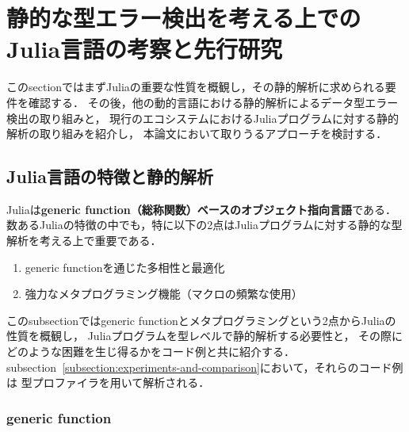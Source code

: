 
\section{静的な型エラー検出を考える上でのJulia言語の考察と先行研究} \label{section:2}

このsectionではまずJuliaの重要な性質を概観し，その静的解析に求められる要件を確認する．
その後，他の動的言語における静的解析によるデータ型エラー検出の取り組みと，
現行のエコシステムにおけるJuliaプログラムに対する静的解析の取り組みを紹介し，
本論文において取りうるアプローチを検討する．


\subsection{Julia言語の特徴と静的解析} \label{subsection:2-1}

Juliaは\textbf{generic function（総称関数）ベースのオブジェクト指向言語}である\footnotemark．
数あるJuliaの特徴の中でも，特に以下の2点はJuliaプログラムに対する静的な型解析を考える上で重要である．

\begin{enumerate}
  \item generic functionを通じた多相性と最適化
  \item 強力なメタプログラミング機能（マクロの頻繁な使用）
\end{enumerate}

このsubsectionではgeneric functionとメタプログラミングという2点からJuliaの性質を概観し，
Juliaプログラムを型レベルで静的解析する必要性と，
その際にどのような困難を生じ得るかをコード例と共に紹介する．
subsection~\ref{subsection:experiments-and-comparison}において，それらのコード例は
型プロファイラを用いて解析される．


\subsubsection{generic function} \label{subsubsection:generic-function}


